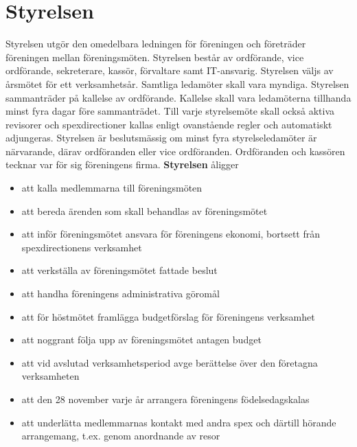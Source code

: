 \documentclass[a4paper]{article}
\begin{document}
\section{Styrelsen}
\label{section:styrelsen}
Styrelsen utgör den omedelbara ledningen för föreningen och företräder föreningen mellan föreningsmöten.\newline
\newline
Styrelsen består av ordförande, vice ordförande, sekreterare, kassör, förvaltare samt IT-ansvarig.\newline
\newline
Styrelsen väljs av årsmötet för ett verksamhetsår. Samtliga ledamöter skall vara myndiga.\newline
\newline
Styrelsen sammanträder på kallelse av ordförande. Kallelse skall vara ledamöterna tillhanda minst fyra dagar före sammanträdet. Till varje styrelsemöte skall också aktiva revisorer och spexdirectioner kallas enligt ovanstående regler och automatiskt adjungeras.\newline
\newline
Styrelsen är beslutsmässig om minst fyra styrelseledamöter är närvarande, därav ordföranden eller vice ordföranden.\newline
\newline
Ordföranden och kassören tecknar var för sig föreningens firma.\newline
\newline
\textbf{Styrelsen} åligger

\begin{itemize}
  \item att kalla medlemmarna till föreningsmöten
  \item att bereda ärenden som skall behandlas av föreningsmötet
  \item att inför föreningsmötet ansvara för föreningens ekonomi, bortsett från spexdirectionens verksamhet
  \item att verkställa av föreningsmötet fattade beslut
  \item att handha föreningens administrativa göromål
  \item att för höstmötet framlägga budgetförslag för föreningens verksamhet
  \item att noggrant följa upp av föreningsmötet antagen budget
  \item att vid avslutad verksamhetsperiod avge berättelse över den företagna verksamheten
  \item att den 28 november varje år arrangera föreningens födelsedagskalas
  \item att underlätta medlemmarnas kontakt med andra spex och därtill hörande arrangemang, t.ex. genom anordnande av resor
\end{itemize}
\end{document}
